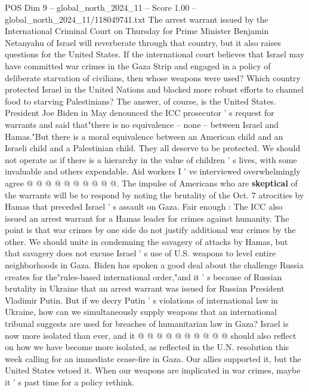 \begin{textsample}{POS Dim 9 – global\_north\_2024\_11 – Score 1.00 – global\_north\_2024\_11/118049741.txt}  \label{ex:f9_pos_239}
The arrest warrant issued by the International Criminal Court on Thursday for Prime Minister Benjamin Netanyahu of Israel will reverberate through that country, but it also raises questions for the United States.
If the international court believes that Israel may have committed war crimes in the Gaza Strip and engaged in a policy of deliberate starvation of civilians, then whose weapons were used?
Which country protected Israel in the United Nations and blocked more robust efforts to channel food to starving Palestinians?
The answer, of course, is the United States.
President Joe Biden in May denounced the ICC prosecutor ' s request for warrants and said that"there is no equivalence -- none -- between Israel and Hamas."But there is a moral equivalence between an American child and an Israeli child and a Palestinian child.
They all deserve to be protected.
We should not operate as if there is a hierarchy in the value of children ' s lives, with some invaluable and others expendable.
Aid workers I ' ve interviewed overwhelmingly agree @ @ @ @ @ @ @ @ @ @.
The impulse of Americans who are \textbf{skeptical} of the warrants will be to respond by noting the brutality of the Oct. 7 atrocities by Hamas that preceded Israel ' s assault on Gaza.
Fair enough : The ICC also issued an arrest warrant for a Hamas leader for crimes against humanity.
The point is that war crimes by one side do not justify additional war crimes by the other.
We should unite in condemning the savagery of attacks by Hamas, but that savagery does not excuse Israel ' s use of U.S. weapons to level entire neighborhoods in Gaza.
Biden has spoken a good deal about the challenge Russia creates for the"rules-based international order,"and it ' s because of Russian brutality in Ukraine that an arrest warrant was issued for Russian President Vladimir Putin.
But if we decry Putin ' s violations of international law in Ukraine, how can we simultaneously supply weapons that an international tribunal suggests are used for breaches of humanitarian law in Gaza?
Israel is now more isolated than ever, and it @ @ @ @ @ @ @ @ @ @ should also reflect on how we have become more isolated, as reflected in the U.N. resolution this week calling for an immediate cease-fire in Gaza.
Our allies supported it, but the United States vetoed it.
When our weapons are implicated in war crimes, maybe it ' s past time for a policy rethink.

\end{textsample}
